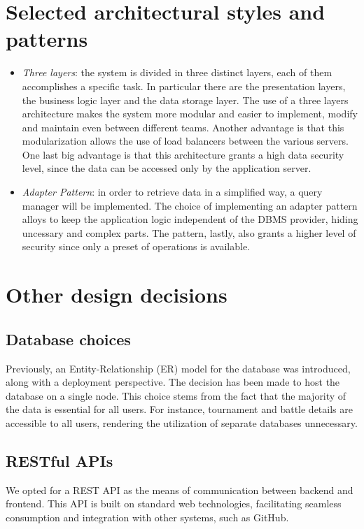 \documentclass[12pt, a4paper]{report}
\begin{document}
    \section{Selected architectural styles and patterns}
    \begin{itemize}
        \item \textit{Three layers}: the system is divided in three distinct layers, each of them accomplishes a specific task.
            In particular there are the presentation layers, the business logic layer and the data storage layer.
            The use of a three layers architecture makes the system more modular and easier to implement, modify and maintain even between different teams.
            Another advantage is that this modularization allows the use of load balancers between the various servers.
            One last big advantage is that this architecture grants a high data security level, since the data can be accessed only by the application server.
        \item \textit{Adapter Pattern}: in order to retrieve data in a simplified way, a query manager will be implemented.
            The choice of implementing an adapter pattern alloys to keep the application logic independent of the DBMS provider, hiding uncessary and complex parts. 
            The pattern, lastly, also grants a higher level of security since only a preset of operations is available.
    \end{itemize}

    \section{Other design decisions}
        \subsection{Database choices}
        Previously, an Entity-Relationship (ER) model for the database was introduced, along with a deployment perspective.
        The decision has been made to host the database on a single node.
        This choice stems from the fact that the majority of the data is essential for all users.
        For instance, tournament and battle details are accessible to all users, rendering the utilization of separate databases unnecessary.
        
        \subsection{RESTful APIs}
        We opted for a REST API as the means of communication between backend and frontend.
        This API is built on standard web technologies, facilitating seamless consumption and integration with other systems, such as GitHub.
\end{document}

